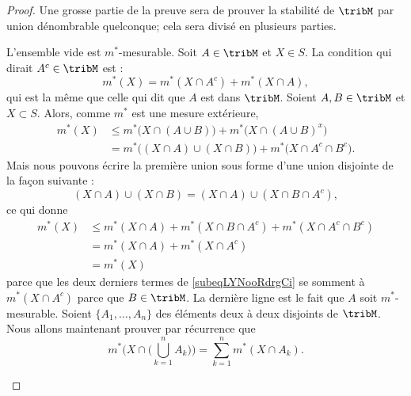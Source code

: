 \begin{proof}
	Une grosse partie de la preuve sera de prouver la stabilité de \( \tribM\) par union dénombrable quelconque; cela sera divisé en plusieurs parties.
	\begin{subproof}
		L'ensemble vide est \( m^*\)-mesurable.
		Soit \( A\in\tribM\) et \( X\in S\). La condition qui dirait \( A^c\in\tribM\) est :
		\begin{equation}
			m^*(X)=m^*(X\cap A^c)+m^*(X\cap A),
		\end{equation}
		qui est la même que celle qui dit que \( A\) est dans \( \tribM\).
		Soient \( A,B\in\tribM\) et \( X\subset S\). Alors, comme \( m^*\) est une mesure extérieure,
		\begin{subequations}
			\begin{align}
				m^*(X) & \leq m^*\big(  X\cap(A\cup B) \big)+m^*\big( X\cap (A\cup B)^x \big)         \\
				       & =    m^*\big( (X\cap A)\cup(X\cap B) \big)+m^*\big( X\cap A^c\cap B^c \big).
			\end{align}
		\end{subequations}
		Mais nous pouvons écrire la première union sous forme d'une union disjointe de la façon suivante :
		\begin{equation}
			(X\cap A)\cup(X\cap B)=(X\cap A)\cup(X\cap B\cap A^c),
		\end{equation}
		ce qui donne
		\begin{subequations}
			\begin{align}
				m^*(X) & \leq m^*(X\cap A)+m^*(X\cap B\cap A^c)+m^*(X\cap A^c\cap B^c)   \label{subeqLYNooRdrgCi} \\
				       & =    m^*(X\cap A)+m^*(X\cap A^c)                                                         \\
				       & =    m^*(X)
			\end{align}
		\end{subequations}
		parce que les deux derniers termes de \eqref{subeqLYNooRdrgCi} se somment à \( m^*(X\cap A^c)\) parce que \( B\in \tribM\). La dernière ligne est le fait que \( A\) soit \( m^*\)-mesurable.
		Soient \( \{ A_1,\ldots, A_n \}\) des éléments deux à deux disjoints de \( \tribM\). Nous allons maintenant prouver par récurrence que
		\begin{equation}    \label{EqBRIooAnPCd}
			m^*\Big( X\cap\big( \bigcup_{k=1}^nA_k \big) \Big)=\sum_{k=1}^nm^*(X\cap A_k).

\end{equation}
\end{subproof}
\end{proof}
